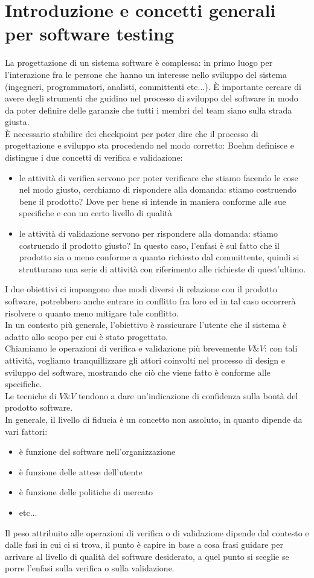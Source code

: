 \documentclass{article}
\begin{document}
\section{Introduzione e concetti generali per software testing}
La progettazione di un sistema software è complessa: in primo luogo per l'interazione fra le persone che hanno un interesse nello sviluppo del sistema (ingegneri, programmatori, analisti, committenti etc...). È importante cercare di avere degli strumenti che guidino nel processo di sviluppo del software in modo da poter definire delle garanzie che tutti i membri del team siano sulla strada giusta.\\È necessario stabilire dei checkpoint per poter dire che il processo di progettazione e sviluppo sta procedendo nel modo corretto: Boehm definisce e distingue i due concetti di verifica e validazione:
\begin{itemize}
\item le attività di verifica servono per poter verificare che stiamo facendo le cose nel modo giusto, cerchiamo di rispondere alla domanda: stiamo costruendo bene il prodotto? Dove per bene si intende in maniera conforme alle sue specifiche e con un certo livello di qualità
\item le attività di validazione servono per rispondere alla domanda: stiamo costruendo il prodotto giusto? In questo caso, l'enfasi è sul fatto che il prodotto sia o meno conforme a quanto richiesto dal committente, quindi si strutturano una serie di attività con riferimento alle richieste di quest'ultimo.
\end{itemize}
I due obiettivi ci impongono due modi diversi di relazione con il prodotto software, potrebbero anche entrare in conflitto fra loro ed in tal caso occorrerà risolvere o quanto meno mitigare tale conflitto.\\ In un contesto più generale, l'obiettivo è rassicurare l'utente che il sistema è adatto allo scopo per cui è stato progettato.\\ Chiamiamo le operazioni di verifica e validazione più brevemente $V\&V$: con tali attività, vogliamo tranquillizzare gli attori coinvolti nel processo di design e sviluppo del software, mostrando che ciò che viene fatto è conforme alle specifiche.\\Le tecniche di $V\&V$ tendono a dare un'indicazione di confidenza sulla bontà del prodotto software.\\ In generale, il livello di fiducia è un concetto non assoluto, in quanto dipende da vari fattori:
\begin{itemize}
\item è funzione del software nell'organizzazione
\item è funzione delle attese dell'utente 
\item è funzione delle politiche di mercato
\item etc...
\end{itemize}
Il peso attribuito alle operazioni di verifica o di validazione dipende dal contesto e dalle fasi in cui ci si trova, il punto è capire in base a cosa frasi guidare per arrivare al livello di qualità del software desiderato, a quel punto si sceglie se porre l'enfasi sulla verifica o sulla validazione.
\end{document}
